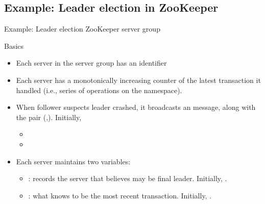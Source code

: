 \subsection{Example: Leader election in ZooKeeper}
\begin{slide}{Example: Leader election  ZooKeeper server group}
  \begin{block}{Basics}
    \begin{itemize}\firmlist
    \item Each server  in the server group has an identifier 
    \item Each server has a monotonically increasing counter  of the latest transaction it
      handled (i.e., series of operations on the namespace).
    \item When follower  suspects leader crashed, it broadcasts an  message, along with the pair
      (,). Initially,
      \begin{itemize}\firmlist
      \item {}
      \item {}
      \end{itemize}
    \item Each server  maintains two variables:
      \begin{itemize}
      \item {}: records the server that  believes may be final
        leader. \newline
        Initially, .
      \item {}: what  knows to be the most recent transaction. \newline
        Initially, .
      \end{itemize}
    \end{itemize}
  \end{block}
\end{slide}
